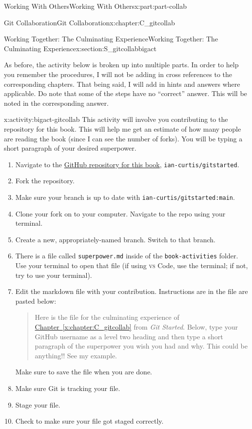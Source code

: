 \documentclass[oneside,10pt,]{book}
\newcommand{\xreffont}{\relax}
\newcommand{\mono}[1]{\texttt{#1}}
\newcommand{\initialism}[1]{\textsc{\MakeLowercase{#1}}}
\newcommand{\pubtitle}[1]{\textsl{#1}}
\begin{document}
\begin{partptx}{Working With Others}{}{Working With Others}{}{}{x:part:part-collab}
\begin{chapterptx}{Git Collaboration}{}{Git Collaboration}{}{}{x:chapter:C_gitcollab}
\begin{sectionptx}{Working Together: The Culminating Experience}{}{Working Together: The Culminating Experience}{}{}{x:section:S_gitcollabbigact}
\par
As before, the activity below is broken up into multiple parts. In order to help you remember the procedures, I will not be adding in cross references to the corresponding chapters. That being said, I will add in hints and answers where applicable. Do note that some of the steps have no “correct” answer. This will be noted in the corresponding answer.%
\begin{activity}{}{x:activity:bigact-gitcollab}%
This activity will involve you contributing to the repository for this book. This will help me get an estimate of how many people are reading the book (since I can see the number of forks). You will be typing a short paragraph of your desired superpower.%
\begin{enumerate}[font=\bfseries,label=(\alph*),ref=\alph*]
\item{}Navigate to the \href{https://github.com/ian-curtis/gitstarted}{GitHub repository for this book}\footnotemark{}, \mono{ian-curtis/gitstarted}.%
\item{}Fork the repository.%
\item{}Make sure your branch is up to date with \mono{ian-curtis/gitstarted:main}.%
\item{}Clone your fork on to your computer. Navigate to the repo using your terminal.%
\item{}Create a new, appropriately-named branch. Switch to that branch.%
\item{}There is a file called \mono{superpower.md} inside of the \mono{book-activities} folder. Use your terminal to open that file (if using \initialism{VS} Code, use the terminal; if not, try to use your terminal).%
\item{}Edit the markdown file with your contribution. Instructions are in the file are pasted below: \begin{quote}%
Here is the file for the culminating experience of \hyperref[x:chapter:C_gitcollab]{Chapter~{\xreffont\ref{x:chapter:C_gitcollab}}} from \pubtitle{Git Started}. Below, type your GitHub username as a level two heading and then type a short paragraph of the superpower you wish you had and why. This could be anything!! See my example.\end{quote}
%
\par
Make sure to save the file when you are done.%
\item{}Make sure Git is tracking your file.%
\item{}Stage your file.%
\item{}Check to make sure your file got staged correctly.%

\end{enumerate}
\end{activity}
\end{sectionptx}
\end{chapterptx}
\end{partptx}
\end{document}
